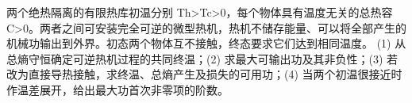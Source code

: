 两个绝热隔离的有限热库初温分别 Th>Tc>0，每个物体具有温度无关的总热容 C>0。两者之间可安装完全可逆的微型热机，热机不储存能量、可以将全部产生的机械功输出到外界。初态两个物体互不接触，终态要求它们达到相同温度。
(1) 从总熵守恒确定可逆热机过程的共同终温；(2) 求最大可输出功及其非负性；(3) 若改为直接导热接触，求终温、总熵产生及损失的可用功；(4) 当两个初温很接近时作温差展开，给出最大功首次非零项的阶数。
